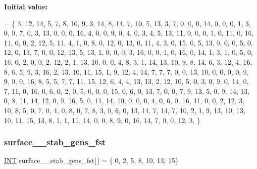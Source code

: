 {\bfseries Initial value\+:}
\begin{DoxyCode}
= \{
     3, 12, 14,  5,  7,  8, 10,  9,  3, 14,  8, 14,  7, 10,  5, 13, 
     3,  7,  0,  0,  0, 14,  0,  0,  0,  1,  3,  0,  0,  7,  0,  3, 
    13,  0,  0,  0, 16,  4,  0,  0,  9,  0,  4,  0,  3,  4,  5, 13, 
    11,  0,  0,  0,  1,  0, 11,  0, 16, 11,  0,  0,  2, 12,  5, 11, 
     4,  1,  0,  8,  0, 12,  0, 13,  0, 11,  4,  3,  0, 15,  0,  5, 
    13,  0,  0,  0,  5,  0, 12,  0, 13,  7,  0,  0, 12, 13,  5, 13, 
     1,  0,  0,  0,  3, 16,  0,  0,  1,  0, 16,  0, 14,  1,  3,  1, 
     0,  5,  0, 16,  0,  2,  0,  0,  2, 12,  2,  1, 13, 10,  0,  0, 
     4,  8,  3,  1, 14, 13, 10,  9,  8, 14,  6,  3, 12,  4, 16,  8, 
     6,  5,  9,  3, 16,  2, 13, 10, 11, 15,  1,  9, 12,  4, 14,  7, 
     7,  7,  0,  0, 13, 10,  0,  0,  0,  0,  9,  9,  0,  0, 16,  8, 
     5,  5,  7,  7, 11, 15, 12,  6,  4,  4, 13, 13,  2, 12, 10,  5, 
     0,  3,  0,  9,  0, 14,  0,  7, 11,  0, 16,  0,  6,  0,  2,  0, 
     5,  0,  0,  0, 15,  0,  6,  0, 13,  7,  0,  0,  7,  9, 13,  5, 
     0,  9, 14, 13,  0,  8, 11, 14, 12,  0,  9, 16,  5,  0, 11, 14, 
    10,  0,  0,  0,  4,  0,  6,  0, 16, 11,  0,  0,  2, 12,  3, 10, 
     8,  5,  0,  7,  0,  4,  0,  8,  0,  7,  8,  3,  0,  6,  0, 13, 
    14,  7, 14,  7, 10,  2,  1,  9, 13, 10, 13, 10, 11, 15, 13,  8, 
     1,  1, 11, 14,  0,  0,  8,  9,  0, 16, 14,  7,  0,  0, 12,  3, 
\}
\end{DoxyCode}
\mbox{\label{surface__17_8_c_a2c0e77eb3c9a928c30488bc6fbac47a7}} 
\subsubsection{\texorpdfstring{surface\+\_\+\_\+stab\+\_\+gens\+\_\+fst}{surface\_17\_stab\_gens\_fst}}
{\footnotesize\ttfamily \mbox{\hyperlink{galois_8h_a09fddde158a3a20bd2dcadb609de11dc}{I\+NT}} surface\+\_\+\_\+stab\+\_\+gens\+\_\+fst\mbox{[}$\,$\mbox{]} = \{ 0, 2, 5, 8, 10, 13, 15\}}

\mbox{\label{surface__17_8_c_a52cb7e4e21eb9f48f3085e017c258bfc}} 
